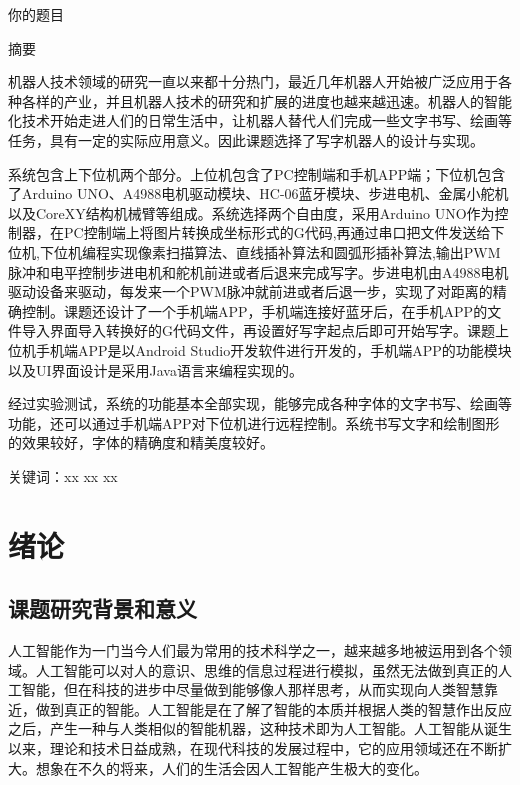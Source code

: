 \documentclass[twoside, fontset=windows]{ctexart}
\title{\zihao{0}\xk{阳\hspace{0.5em}光\hspace{0.5em}学\hspace{0.5em}院}}
\author{作者}
\begin{document}
\maketitle
\newpage
{}
\thispagestyle{empty}
\begin{center}
  \heiti{}你的题目
  
  \vspace{1em}  
  \heiti{}摘要
\end{center}

{\songti{}
机器人技术领域的研究一直以来都十分热门，最近几年机器人开始被广泛应用于各种各样的产业，并且机器人技术的研究和扩展的进度也越来越迅速。机器人的智能化技术开始走进人们的日常生活中，让机器人替代人们完成一些文字书写、绘画等任务，具有一定的实际应用意义。因此课题选择了写字机器人的设计与实现。

系统包含上下位机两个部分。上位机包含了PC控制端和手机APP端；下位机包含了Arduino UNO、A4988电机驱动模块、HC-06蓝牙模块、步进电机、金属小舵机以及CoreXY结构机械臂等组成。系统选择两个自由度，采用Arduino UNO作为控制器，在PC控制端上将图片转换成坐标形式的G代码,再通过串口把文件发送给下位机,下位机编程实现像素扫描算法、直线插补算法和圆弧形插补算法,输出PWM脉冲和电平控制步进电机和舵机前进或者后退来完成写字。步进电机由A4988电机驱动设备来驱动，每发来一个PWM脉冲就前进或者后退一步，实现了对距离的精确控制。课题还设计了一个手机端APP，手机端连接好蓝牙后，在手机APP的文件导入界面导入转换好的G代码文件，再设置好写字起点后即可开始写字。课题上位机手机端APP是以Android Studio开发软件进行开发的，手机端APP的功能模块以及UI界面设计是采用Java语言来编程实现的。

经过实验测试，系统的功能基本全部实现，能够完成各种字体的文字书写、绘画等功能，还可以通过手机端APP对下位机进行远程控制。系统书写文字和绘制图形的效果较好，字体的精确度和精美度较好。

}
\vspace{1em}
{\heiti {}\raggedleft 关键词：xx\hspace{2em} xx\hspace{2em} xx}

\newpage
\tableofcontents
\thispagestyle{empty}
\newpage

\section{绪论}
  \subsection{课题研究背景和意义}
  {
  人工智能作为一门当今人们最为常用的技术科学之一，越来越多地被运用到各个领域。人工智能可以对人的意识、思维的信息过程进行模拟，虽然无法做到真正的人工智能，但在科技的进步中尽量做到能够像人那样思考，从而实现向人类智慧靠近，做到真正的智能。人工智能是在了解了智能的本质并根据人类的智慧作出反应之后，产生一种与人类相似的智能机器，这种技术即为人工智能。人工智能从诞生以来，理论和技术日益成熟，}在现代科技的发展过程中，它的应用领域还在不断扩大。想象在不久的将来，人们的生活会因人工智能产生极大的变化。
\end{document}
